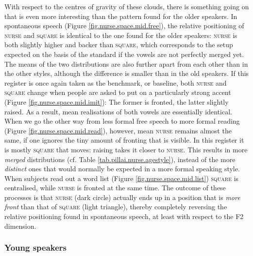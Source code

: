 With respect to the centres of gravity of these  clouds, there is something going on that is even more interesting than the pattern found for the older speakers.
In spontaneous speech (Figure \ref{fig.nurse.space.mid.free}), the relative positioning of \textsc{nurse} and \textsc{square} is identical to the one found for the older speakers: \textsc{nurse} is both slightly higher and backer than \textsc{square}, which corresponds to the setup expected on the basis of the standard if the vowels are not perfectly merged yet.
The means of the two distributions are also further apart from each other than in the other styles, although the difference is smaller than in the old speakers.
If this register is once again taken as the benchmark, or baseline, both \textsc{nurse} and \textsc{square} change when people are asked to put on a particularly strong  accent (Figure \ref{fig.nurse.space.mid.imit}): The former is fronted, the latter slightly raised.
As a result, mean realisations of both vowels are essentially identical.
When we go the other way from less formal free speech to more formal reading (Figure \ref{fig.nurse.space.mid.read}), however, mean \textsc{nurse} remains almost the same, if one ignores the tiny amount of fronting that is visible.
In this register it is mostly \textsc{square} that moves: raising takes it closer to \textsc{nurse}.
This results in more \emph{merged} distributions (cf. Table \ref{tab.pillai.nurse.agestyle}), instead of the more \emph{distinct} ones that would normally be expected in a more formal speaking style.
When subjects read out a word list (Figure \ref{fig.nurse.space.mid.list}) \textsc{square} is centralised, while \textsc{nurse} is fronted at the same time.
The outcome of these processes is that \textsc{nurse} (dark circle) actually ends up in a position that is \emph{more front} than that of \textsc{square} (light triangle), thereby completely reversing the relative positioning found in spontaneous speech, at least with respect to the F2 dimension.

\subsubsection{Young speakers}

